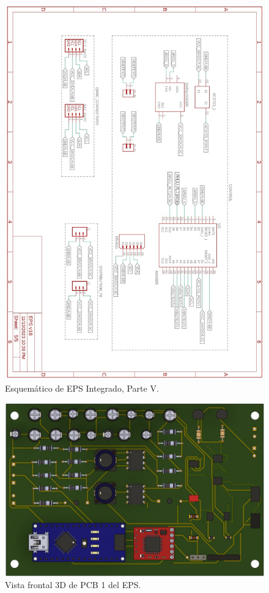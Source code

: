 \newpage
\begin{figure}[h]
  \centering
  \includegraphics[width=\textwidth]{Pictures/EPS_Sheets_page-0005.jpg}
  \caption{Esquemático de EPS Integrado, Parte V.}
  \label{fig:EPS_Sheet5}
\end{figure}

\newpage
\begin{figure}[h]
  \centering
  \includegraphics[width=\textwidth]{Pictures/EPS_FINAL.png}
  \caption{Vista frontal 3D de PCB 1 del EPS.}
  \label{fig:EPS_Final1}
\end{figure}

